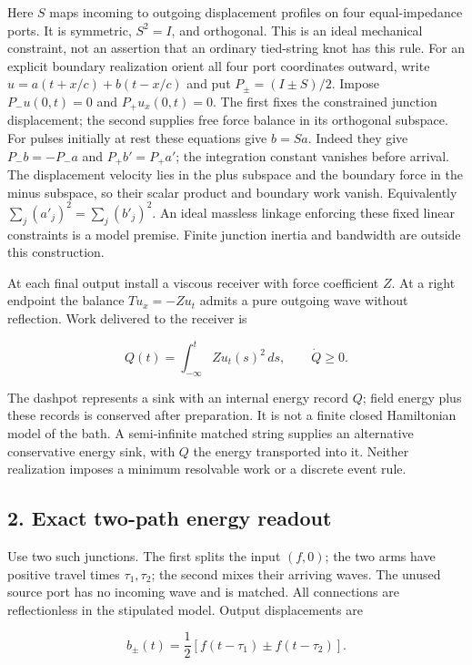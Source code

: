 \documentclass[11pt,a4paper]{article}
\begin{document}
Here \(S\) maps incoming to outgoing displacement profiles on four
equal-impedance ports. It is symmetric, \(S^2=I\), and orthogonal. This
is an ideal mechanical constraint, not an assertion that an ordinary
tied-string knot has this rule. For an explicit boundary realization
orient all four port coordinates outward, write \(u=a(t+x/c)+b(t-x/c)\)
and put \(P_\pm=(I\pm S)/2\). Impose \(P_-u(0,t)=0\) and
\(P_+u_x(0,t)=0\). The first fixes the constrained junction
displacement; the second supplies free force balance in its orthogonal
subspace. For pulses initially at rest these equations give \(b=Sa\).
Indeed they give \(P_-b=-P_-a\) and \(P_+b'=P_+a'\); the integration
constant vanishes before arrival. The displacement velocity lies in the
plus subspace and the boundary force in the minus subspace, so their
scalar product and boundary work vanish. Equivalently
\(\sum_j(a'_j)^2=\sum_j(b'_j)^2\). An ideal massless linkage enforcing
these fixed linear constraints is a model premise. Finite junction
inertia and bandwidth are outside this construction.

At each final output install a viscous receiver with force coefficient
\(Z\). At a right endpoint the balance \(Tu_x=-Z u_t\) admits a pure
outgoing wave without reflection. Work delivered to the receiver is

\[
Q(t)=\int_{-\infty}^t Z u_t(s)^2\,ds,\qquad \dot Q\ge0.
\]

The dashpot represents a sink with an internal energy record \(Q\);
field energy plus these records is conserved after preparation. It is
not a finite closed Hamiltonian model of the bath. A semi-infinite
matched string supplies an alternative conservative energy sink, with
\(Q\) the energy transported into it. Neither realization imposes a
minimum resolvable work or a discrete event rule.

\hypertarget{exact-two-path-energy-readout}{%
\subsection{2. Exact two-path energy
readout}\label{exact-two-path-energy-readout}}

Use two such junctions. The first splits the input \((f,0)\); the two
arms have positive travel times \(\tau_1,\tau_2\); the second mixes
their arriving waves. The unused source port has no incoming wave and is
matched. All connections are reflectionless in the stipulated model.
Output displacements are

\[
b_\pm(t)=\frac12[f(t-\tau_1)\pm f(t-\tau_2)].
\]
\end{document}
